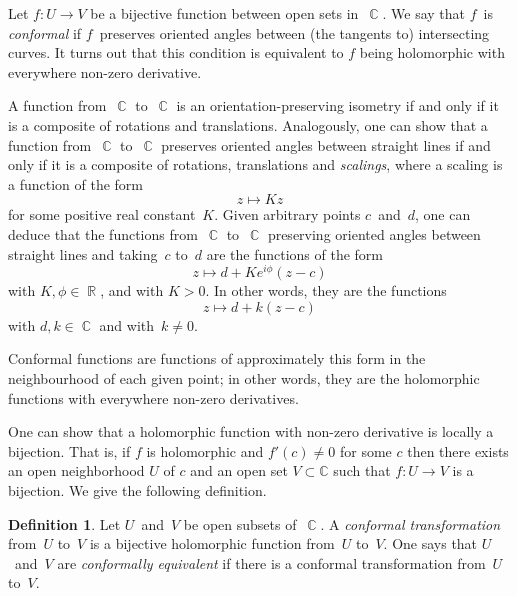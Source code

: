 \documentclass{amsproc}
\theoremstyle{definition}
\newtheorem{definition}[theorem]{Definition}
\theoremstyle{remark}
\DeclareMathOperator{\R}{\mathbb{R}}
\DeclareMathOperator{\C}{\mathbb{C}}
\numberwithin{equation}{section}
\begin{document}
Let $ f: U \to V $ be a bijective function between open sets in~$ \C $. We say that $ f $~is \emph{conformal} if $ f $~preserves oriented angles between (the tangents to)
intersecting curves. It turns out that this condition is equivalent to $ f $ being holomorphic with everywhere non-zero derivative.

A function from~$ \C $ to~$ \C $ is an orientation-preserving isometry if and only if it is a composite of rotations and translations. Analogously, one can show
that a function from~$ \C $ to~$ \C $ preserves oriented angles between straight lines if and only if it is a composite of rotations, translations and \emph{scalings}, where a scaling
is a function of the form
$$
z \mapsto Kz
$$
for some positive real constant~$ K $. Given arbitrary points $ c $~and~$ d $, one can deduce that the functions from~$ \C $ to~$ \C $ preserving oriented angles between straight
lines and taking~$ c $ to~$ d $ are the functions of the form
$$
z \mapsto d + Ke^{i\phi}(z - c)
$$
with $ K,\phi \in \R $, and with $ K > 0 $. In other words, they are the functions
$$
z \mapsto d + k(z - c)
$$
with $ d,k \in \C $ and with~$ k \neq 0 $.

Conformal functions are functions of approximately this form in the neighbourhood of each given point; in other words, they are the holomorphic functions with everywhere
non-zero derivatives.

One can show that a holomorphic function with non-zero derivative is locally a bijection. That is, if $ f $ is holomorphic and $ f'(c) \neq 0 $ for some $ c $ then
there exists an open neighborhood $ U $ of $ c $ and an open set $ V \subset \mathbb{C} $ such that $ f: U \rightarrow V $ is a bijection.
We give the following definition.

\begin{definition} \label{CMD14.1}
Let $ U $~and~$ V $ be open subsets of~$ \C $. A \emph{conformal transformation} from~$ U $ to~$ V $ is a bijective holomorphic function from~$ U $ to~$ V $.
One says that $ U $~and~$ V $ are \emph{conformally equivalent} if there is a conformal transformation from~$ U $ to~$ V $.
\end{definition}
\end{document}
